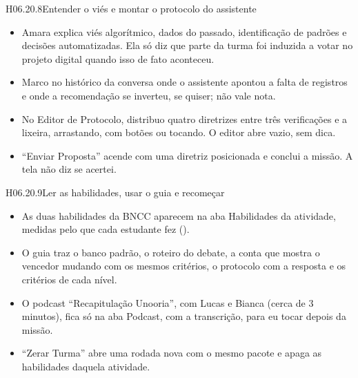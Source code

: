 \begin{historia}{H06.20.8}{Entender o viés e montar o protocolo do assistente}{\pronto}
\aceite
\begin{itemize}
  \item Amara explica viés algorítmico, dados do passado, identificação de
    padrões e decisões automatizadas. Ela só diz que parte da turma foi
    induzida a votar no projeto digital quando isso de fato aconteceu.
  \item Marco no histórico da conversa onde o assistente apontou a falta de
    registros e onde a recomendação se inverteu, se quiser; não vale nota.
  \item No Editor de Protocolo, distribuo quatro diretrizes entre três
    verificações e a lixeira, arrastando, com botões ou tocando. O editor
    abre vazio, sem dica.
  \item \enquote{Enviar Proposta} acende com uma diretriz posicionada e
    conclui a missão. A tela não diz se acertei.
\end{itemize}
\end{historia}

\begin{historia}{H06.20.9}{Ler as habilidades, usar o guia e recomeçar}{\pronto}
\aceite
\begin{itemize}
  \item As duas habilidades da BNCC aparecem na aba Habilidades da
    atividade, medidas pelo que cada estudante fez ().
  \item O guia traz o banco padrão, o roteiro do debate, a conta que mostra o
    vencedor mudando com os mesmos critérios, o protocolo com a resposta e
    os critérios de cada nível.
  \item O podcast \enquote{Recapitulação Unooria}, com Lucas e Bianca (cerca
    de 3 minutos), fica só na aba Podcast, com a transcrição, para eu tocar
    depois da missão.
  \item \enquote{Zerar Turma} abre uma rodada nova com o mesmo pacote e apaga
    as habilidades daquela atividade.
\end{itemize}
\end{historia}


